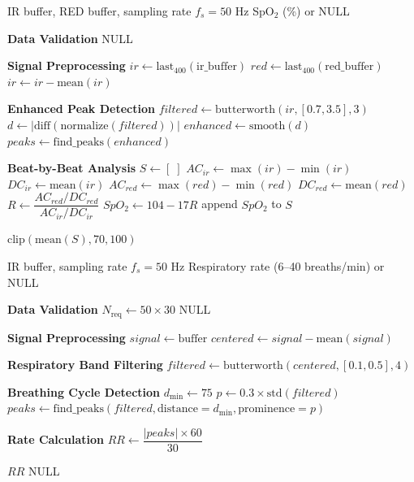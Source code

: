 \documentclass{ieeeaccess}
\begin{document}
\begin{algorithm}[!t]
\caption{Oxygen Saturation (SpO$_2$) Calculation}
\label{alg:SpO$_2$}
\footnotesize
\begin{algorithmic}[1]
\Require IR buffer, RED buffer, sampling rate $f_s = 50$ Hz
\Ensure SpO$_2$ (\%) or NULL

\Statex \textbf{Data Validation}
    \State \Return NULL
\EndIf

\Statex \textbf{Signal Preprocessing}
\State $ir \gets \text{last}_{400}(\text{ir\_buffer})$
\State $red \gets \text{last}_{400}(\text{red\_buffer})$
\State $ir \gets ir - \text{mean}(ir)$

\Statex \textbf{Enhanced Peak Detection}
\State $filtered \gets \text{butterworth}(ir,[0.7,3.5],3)$
\State $d \gets |\text{diff}(\text{normalize}(filtered))|$
\State $enhanced \gets \text{smooth}(d)$
\State $peaks \gets \text{find\_peaks}(enhanced)$

\Statex \textbf{Beat-by-Beat Analysis}
\State $S \gets [\;]$
    \State $AC_{ir} \gets \max(ir)-\min(ir)$
    \State $DC_{ir} \gets \text{mean}(ir)$
    \State $AC_{red} \gets \max(red)-\min(red)$
    \State $DC_{red} \gets \text{mean}(red)$
    \State $R \gets \dfrac{AC_{red}/DC_{red}}{AC_{ir}/DC_{ir}}$
    \State $SpO_2 \gets 104 - 17R$
    \State append $SpO_2$ to $S$
\EndFor

\State \Return $\text{clip}(\text{mean}(S),70,100)$
\end{algorithmic}
\end{algorithm}

\begin{algorithm}[!t]
\caption{Respiratory Rate Estimation from PPG}
\label{alg:respiratory_rate}
\footnotesize
\begin{algorithmic}[1]
\Require IR buffer, sampling rate $f_s = 50$ Hz
\Ensure Respiratory rate (6--40 breaths/min) or NULL

\Statex \textbf{Data Validation}
\State $N_{\text{req}} \gets 50 \times 30$
    \State \Return NULL
\EndIf

\Statex \textbf{Signal Preprocessing}
\State $signal \gets \text{buffer}$
\State $centered \gets signal - \text{mean}(signal)$

\Statex \textbf{Respiratory Band Filtering}
\State $filtered \gets \text{butterworth}(centered,[0.1,0.5],4)$

\Statex \textbf{Breathing Cycle Detection}
\State $d_{\min} \gets 75$
\State $p \gets 0.3 \times \text{std}(filtered)$
\State $peaks \gets \text{find\_peaks}(filtered,\text{distance}=d_{\min},\text{prominence}=p)$

\Statex \textbf{Rate Calculation}
\State $RR \gets \dfrac{|peaks| \times 60}{30}$

    \State \Return $RR$
\Else
    \State \Return NULL
\EndIf
\end{algorithmic}
\end{algorithm}
\end{document}
